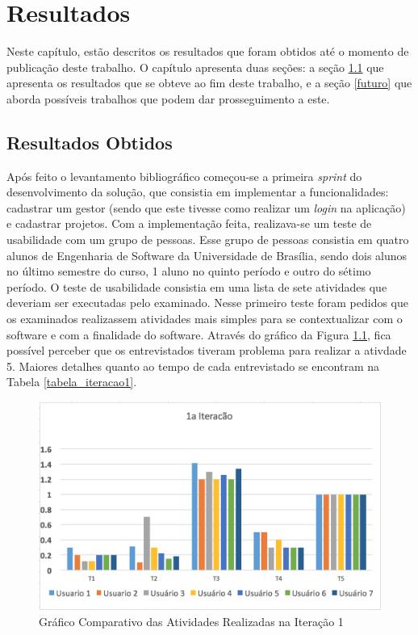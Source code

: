 \chapter[Resultados]{Resultados}
\label{sec:resultados}
Neste capítulo, estão descritos os resultados que foram obtidos até o momento de publicação deste trabalho. O capítulo apresenta duas seções: a seção \ref{resultados_obtidos} que apresenta os resultados que se obteve ao fim deste trabalho, e a seção \ref{futuro} que aborda possíveis trabalhos que podem dar prosseguimento a este.

\section{Resultados Obtidos}
\label{resultados_obtidos}

Após feito o levantamento bibliográfico começou-se a primeira \textit{sprint} do desenvolvimento da solução, que consistia em implementar a funcionalidades: cadastrar um gestor (sendo que este tivesse como realizar um \textit{login} na aplicação) e cadastrar projetos. Com a implementação feita, realizava-se um teste de usabilidade com um grupo de pessoas. Esse grupo de pessoas consistia em quatro alunos de Engenharia de Software da Universidade de Brasília, sendo dois alunos no último semestre do curso, 1 aluno no quinto período e outro do sétimo período. O teste de usabilidade consistia em uma lista de sete atividades que deveriam ser executadas pelo examinado. Nesse primeiro teste foram pedidos que os examinados realizassem atividades mais simples para se contextualizar com o software e com a finalidade do software. Através do gráfico da Figura \ref{img:grafico_iteracao1}, fica possível perceber que os entrevistados tiveram problema para realizar a ativdade 5. Maiores detalhes quanto ao tempo de cada entrevistado se encontram na Tabela \ref{tabela_iteracao1}.

\graphicspath{{figuras/}}
\begin{figure}[!h]
\centering
\includegraphics[scale=0.75]{iteracao1_grafico}
\caption{Gráfico Comparativo das Atividades Realizadas na Iteração 1}
\label{img:grafico_iteracao1}
\end{figure}


